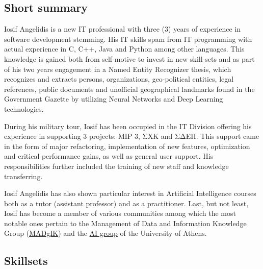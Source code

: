 \documentclass[a4paper,oneside,10pt]{article}
\begin{document}
\subsection*{Short summary}

\begin{sloppypar}
	Iosif Angelidis is a new IT professional with three (3) years of experience in software development stemming. 
	His IT skills spam from IT programming with actual experience in C, C++, Java and Python among other languages. 
	This knowledge is gained both from self-motive to invest in new skill-sets and as part of his two years engagement in a Named Entity Recognizer thesis, 
	which recognizes and extracts persons, organizations, geo-political entities, legal references, public documents and 
	unofficial geographical landmarks found in the Government Gazette by utilizing Neural Networks and Deep Learning technologies.
	
	During his military tour, Iosif has been occupied in the IT Division offering his experience in supporting 3 projects: MIP 3, ΣΧΚ and ΣΔΕΠ. This support came in the form of major refactoring, implementation of new features, optimization and critical performance gains, as well as general user support. His responsibilities further included the training of new staff and knowledge transferring.
	
	Iosif Angelidis has also shown particular interest in Artificial Intelligence courses both as a tutor (assistant professor) and as a practitioner. 
	Last, but not least, Iosif has become a member of various communities among which the most notable ones pertain to the Management of Data and Information Knowledge Group (\href{http://www.madgik.di.uoa.gr}{MADgIK}) and the \href{http://ai.di.uoa.gr/}{AI group} of the University of Athens. 
\end{sloppypar}

\subsection*{Skillsets}
\end{document}
